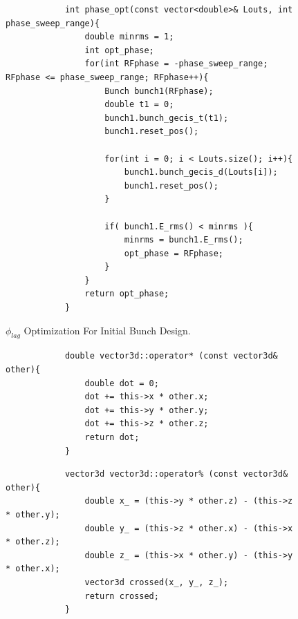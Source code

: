 \documentclass[a4paper,oneside,12pt]{report}
\numberwithin{equation}{chapter}
\begin{document}
{\begin{figure}[H]
        \centering
        \begin{verbatim}
            int phase_opt(const vector<double>& Louts, int phase_sweep_range){
                double minrms = 1;
                int opt_phase;
                for(int RFphase = -phase_sweep_range; RFphase <= phase_sweep_range; RFphase++){
                    Bunch bunch1(RFphase);
                    double t1 = 0;
                    bunch1.bunch_gecis_t(t1);
                    bunch1.reset_pos();
            
                    for(int i = 0; i < Louts.size(); i++){
                        bunch1.bunch_gecis_d(Louts[i]);
                        bunch1.reset_pos();
                    }
                        
                    if( bunch1.E_rms() < minrms ){
                        minrms = bunch1.E_rms();
                        opt_phase = RFphase;
                    }
                }
                return opt_phase;
            }
        \end{verbatim}
    \vspace{0pt}
    \caption{$\phi_{lag}$ Optimization For Initial Bunch Design.}
    \label{fig:phlag_opt_n_pass}
\end{figure}

\vspace{5pt}
\begin{figure}[H]
    \begin{minipage}{\textwidth}
        \begin{verbatim}
            double vector3d::operator* (const vector3d& other){
                double dot = 0;
                dot += this->x * other.x;
                dot += this->y * other.y;
                dot += this->z * other.z;
                return dot;
            }
        \end{verbatim}
    \end{minipage}
    \vspace{10pt}
    \begin{minipage}{\textwidth}
        \begin{verbatim}
            vector3d vector3d::operator% (const vector3d& other){
                double x_ = (this->y * other.z) - (this->z * other.y);
                double y_ = (this->z * other.x) - (this->x * other.z);
                double z_ = (this->x * other.y) - (this->y * other.x);
                vector3d crossed(x_, y_, z_);
                return crossed;
            }
        \end{verbatim}
    \end{minipage}


\end{figure}}
\end{document}
